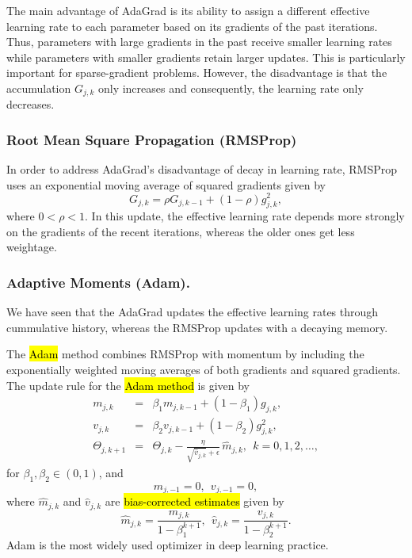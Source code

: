 The main advantage of AdaGrad is its ability to assign a different effective learning rate to each parameter based on its gradients of the past iterations. Thus, parameters with large gradients in the past receive smaller learning rates while parameters with smaller gradients retain larger updates. This is particularly important for sparse-gradient problems.  However, the disadvantage is that the accumulation $G_{j,k}$ only increases and consequently, the learning rate only decreases.
\subsubsection{Root Mean Square Propagation (RMSProp)}
In order to address AdaGrad’s disadvantage of decay in learning rate, RMSProp uses an exponential moving average of squared gradients given by
$$
G_{j,k} = \rho G_{j,k-1} + (1-\rho) g_{j,k}^2,
$$
where $0<\rho<1$. In this update, the effective learning rate depends more strongly on the gradients of the recent iterations, whereas the older ones get less weightage.

\subsubsection{Adaptive Moments (Adam).}
We have seen that the AdaGrad updates the effective learning rates through cummulative history, whereas the RMSProp updates with a decaying memory.

The \hl{Adam} method combines RMSProp with momentum by including the exponentially weighted moving averages of both gradients and squared gradients. The update rule for the \hl{Adam method} is given by
$$\begin{array}{rcl}
m_{j,k} &=& \beta_1 m_{j,k-1} + (1-\beta_1) g_{j,k}, \\
v_{j,k} &=& \beta_2 v_{j,k-1} + (1-\beta_2) g_{j,k}^2, \\
\Theta_{j,k+1} &=& \Theta_{j,k} - \frac{\eta}{\sqrt{\widehat{v}_{j,k}}+\epsilon}\, \widehat{m}_{j,k},~~k=0,1,2,\ldots,
\end{array}$$
for $\beta_1, \beta_2\in (0,1)$, and
$$
m_{j,-1} = 0,~~v_{j,-1} = 0,
$$
where $\widehat{m}_{j,k}$ and $\widehat{v}_{j,k}$ are \hl{bias-corrected estimates} given by
$$
\widehat{m}_{j,k} = \frac{m_{j,k}}{1-\beta_1^{k+1}},~~\widehat{v}_{j,k} = \frac{v_{j,k}}{1-\beta_2^{k+1}}.
$$ 
Adam is the most widely used optimizer in deep learning practice.

